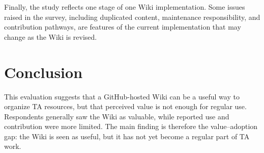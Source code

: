 \documentclass[11pt]{article}
\newcommand{\td}[1]{\item \textcolor{red!70!black}{TODO: #1}}
\begin{document}
Finally, the study reflects one stage of one Wiki implementation. Some issues raised in the survey, including duplicated content, maintenance responsibility, and contribution pathways, are features of the current implementation that may change as the Wiki is revised. 



\section{Conclusion}


This evaluation suggests that a GitHub-hosted Wiki can be a useful way to organize TA resources, but that perceived value is not enough for regular use. Respondents generally saw the Wiki as valuable, while reported use and contribution were more limited. The main finding is therefore the value--adoption gap: the Wiki is seen as useful, but it has not yet become a regular part of TA work.
\end{document}
